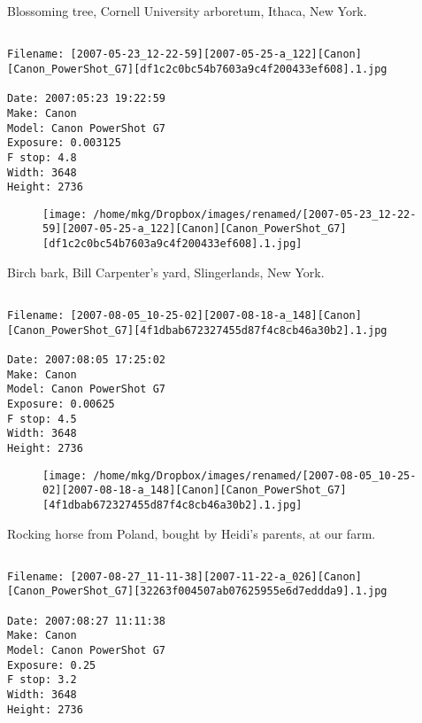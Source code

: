 \clearpage
\onecolumn
\noindent Blossoming tree, Cornell University arboretum, Ithaca, New York.
\noindent
\begin{lstlisting}

Filename: [2007-05-23_12-22-59][2007-05-25-a_122][Canon][Canon_PowerShot_G7][df1c2c0bc54b7603a9c4f200433ef608].1.jpg

Date: 2007:05:23 19:22:59
Make: Canon
Model: Canon PowerShot G7
Exposure: 0.003125
F stop: 4.8
Width: 3648
Height: 2736
\end{lstlisting}
\clearpage

\begin{figure}
\texttt{[image: /home/mkg/Dropbox/images/renamed/[2007-05-23\_12-22-59][2007-05-25-a\_122][Canon][Canon\_PowerShot\_G7][df1c2c0bc54b7603a9c4f200433ef608].1.jpg]}
\end{figure}
    
\clearpage
\onecolumn
\noindent Birch bark, Bill Carpenter's yard, Slingerlands, New York.
\noindent
\begin{lstlisting}

Filename: [2007-08-05_10-25-02][2007-08-18-a_148][Canon][Canon_PowerShot_G7][4f1dbab672327455d87f4c8cb46a30b2].1.jpg

Date: 2007:08:05 17:25:02
Make: Canon
Model: Canon PowerShot G7
Exposure: 0.00625
F stop: 4.5
Width: 3648
Height: 2736
\end{lstlisting}
\clearpage

\begin{figure}
\texttt{[image: /home/mkg/Dropbox/images/renamed/[2007-08-05\_10-25-02][2007-08-18-a\_148][Canon][Canon\_PowerShot\_G7][4f1dbab672327455d87f4c8cb46a30b2].1.jpg]}
\end{figure}
    
\clearpage
\onecolumn
\noindent Rocking horse from Poland, bought by Heidi's parents, at our farm.
\noindent
\begin{lstlisting}

Filename: [2007-08-27_11-11-38][2007-11-22-a_026][Canon][Canon_PowerShot_G7][32263f004507ab07625955e6d7eddda9].1.jpg

Date: 2007:08:27 11:11:38
Make: Canon
Model: Canon PowerShot G7
Exposure: 0.25
F stop: 3.2
Width: 3648
Height: 2736
\end{lstlisting}
\clearpage

